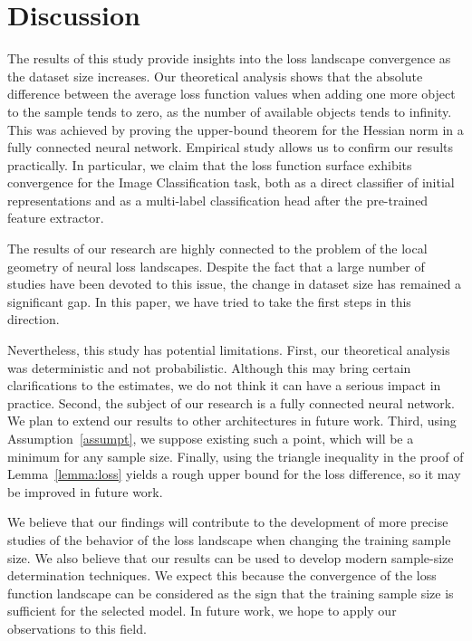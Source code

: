 \documentclass{article}
\begin{document}
\section{Discussion}\label{sec:disc}

The results of this study provide insights into the loss landscape convergence as the dataset size increases. Our theoretical analysis shows that the absolute difference between the average loss function values when adding one more object to the sample tends to zero, as the number of available objects tends to infinity. This was achieved by proving the upper-bound theorem for the Hessian norm in a fully connected neural network. Empirical study allows us to confirm our results practically. In particular, we claim that the loss function surface exhibits convergence for the Image Classification task, both as a direct classifier of initial representations and as a multi-label classification head after the pre-trained feature extractor. 

The results of our research are highly connected to the problem of the local geometry of neural loss landscapes. Despite the fact that a large number of studies have been devoted to this issue, the change in dataset size has remained a significant gap. In this paper, we have tried to take the first steps in this direction. 

Nevertheless, this study has potential limitations. First, our theoretical analysis was deterministic and not probabilistic. Although this may bring certain clarifications to the estimates, we do not think it can have a serious impact in practice. Second, the subject of our research is a fully connected neural network. We plan to extend our results to other architectures in future work. Third, using Assumption~\ref{assumpt}, we suppose existing such a point, which will be a minimum for any sample size.  Finally, using the triangle inequality in the proof of Lemma~\ref{lemma:loss} yields a rough upper bound for the loss difference, so it may be improved in future work. 

We believe that our findings will contribute to the development of more precise studies of the behavior of the loss landscape when changing the training sample size. We also believe that our results can be used to develop modern sample-size determination techniques. We expect this because the convergence of the loss function landscape can be considered as the sign that the training sample size is sufficient for the selected model. In future work, we hope to apply our observations to this field.
\end{document}
